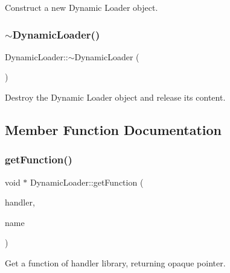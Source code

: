 Construct a new Dynamic Loader object. 

\mbox{\label{classo_z_1_1_dynamic_loader_a48b8658929c54dbb03a79f752d2fc131}} 
\subsubsection{\texorpdfstring{$\sim$DynamicLoader()}{~DynamicLoader()}}
{\footnotesize\ttfamily Dynamic\+Loader\+::$\sim$\+Dynamic\+Loader (\begin{DoxyParamCaption}\item[{void}]{ }\end{DoxyParamCaption})}



Destroy the Dynamic Loader object and release its content. 



\subsection{Member Function Documentation}
\mbox{\label{classo_z_1_1_dynamic_loader_a136f9d35245f4e3d556d7f4eae951cdf}} 
\subsubsection{\texorpdfstring{getFunction()}{getFunction()}\hspace{0.1cm}{\footnotesize\ttfamily [1/2]}}
{\footnotesize\ttfamily void $\ast$ Dynamic\+Loader\+::get\+Function (\begin{DoxyParamCaption}\item[{\mbox{\hyperlink{namespaceo_z_a4f8ae5685d0f7dca498d73129b482f2d}{Dynamic\+Handler}}}]{handler,  }\item[{const std\+::string \&}]{name }\end{DoxyParamCaption})}



Get a function of handler library, returning opaque pointer. 

\mbox{\label{classo_z_1_1_dynamic_loader_ad5c090a613bec9cf397a479bf3257cfa}} 
